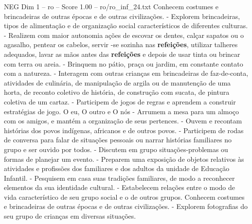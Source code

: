\begin{textsample}{NEG Dim 1 – ro – Score 1.00 – ro/ro\_inf\_24.txt}
Conhecem costumes e brincadeiras de outras épocas e de outras civilizações. - Explorem brincadeiras, tipos de alimentação e de organização social característicos de diferentes culturas. - Realizem com maior autonomia ações de escovar os dentes, calçar sapatos ou o agasalho, pentear os cabelos, servir -se sozinha nas \textbf{refeições}, utilizar talheres adequados, lavar as mãos antes das \textbf{refeições} e depois de usar tinta ou brincar com terra ou areia. - Brinquem no pátio, praça ou jardim, em constante contato com a natureza. - Interagem com outras crianças em brincadeiras de faz-de-conta, atividades de culinária, de manipulação de argila ou de manutenção de uma horta, de reconto coletivo de história, de construção com sucata, de pintura coletiva de um cartaz. - Participem de jogos de regras e aprendem a construir estratégias de jogo.
O eu, O outro e O nós - Arrumem a mesa para um almoço com os amigos, e mantém a organização de seus pertences. - Ouvem e recontam histórias dos povos indígenas, africanos e de outros povos. - Participem de rodas de conversa para falar de situações pessoais ou narrar histórias familiares no grupo e ser ouvido por todos. - Discutem em grupo situações-problemas ou formas de planejar um evento. - Preparem uma exposição de objetos relativos às atividades e profissões dos familiares e dos adultos da unidade de Educação Infantil. - Pesquisem em casa suas tradições familiares, de modo a reconhecer elementos da sua identidade cultural. - Estabelecem relações entre o modo de vida característico de seu grupo social e o de outros grupos.
Conhecem costumes e brincadeiras de outras épocas e de outras civilizações. - Explorem fotografias do seu grupo de crianças em diversas situações.

\end{textsample}
